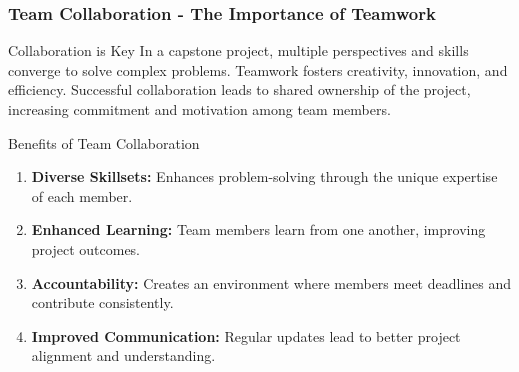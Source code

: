 \documentclass[aspectratio=169]{beamer}
\begin{document}
\begin{frame}[fragile]
    \frametitle{Team Collaboration - The Importance of Teamwork}
    \begin{block}{Collaboration is Key}
        In a capstone project, multiple perspectives and skills converge to solve complex problems. Teamwork fosters creativity, innovation, and efficiency. Successful collaboration leads to shared ownership of the project, increasing commitment and motivation among team members.
    \end{block}
    
    \begin{block}{Benefits of Team Collaboration}
        \begin{enumerate}
            \item \textbf{Diverse Skillsets:} Enhances problem-solving through the unique expertise of each member.
            \item \textbf{Enhanced Learning:} Team members learn from one another, improving project outcomes.
            \item \textbf{Accountability:} Creates an environment where members meet deadlines and contribute consistently.
            \item \textbf{Improved Communication:} Regular updates lead to better project alignment and understanding.
        \end{enumerate}
    \end{block}
\end{frame}
\end{document}
